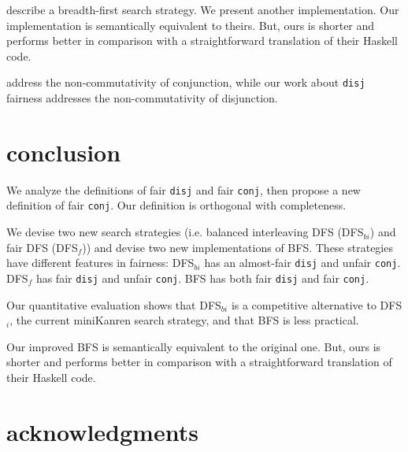\documentclass[format=acmlarge, review=true, authordraft=true]{acmart}
\newcommand{\conj}{\texttt{conj}}
\newcommand{\disj}{\texttt{disj}}
\newcommand{\DFSi }[0]{DFS$_{i}$}
\newcommand{\DFSf }[0]{DFS$_{f}$}
\newcommand{\DFSbi}[0]{DFS$_{bi}$}
\newcommand{\BFS}[0]{BFS}
\newcommand{\BFSser}[0]{BFS}
\begin{document}
\citet{seres1999algebra} describe a breadth-first search 
strategy. We present another implementation. Our implementation is semantically 
equivalent to theirs. But, ours is shorter and performs better in comparison 
with a straightforward translation of their Haskell code.

\citet{rozplokhas2018improving} address the non-commutativity of conjunction, 
while our work about \disj{} fairness addresses the non-commutativity of 
disjunction.


\section{conclusion}

We analyze the definitions of fair \disj{} and fair \conj{}, then propose a 
new definition of fair \conj{}. Our definition is orthogonal with completeness.

We devise two new search strategies (i.e. balanced interleaving DFS 
(\DFSbi{}) and fair DFS (\DFSf{})) and devise two new 
implementations of \BFS. These strategies have different features 
in fairness: \DFSbi{} has an almost-fair \disj{} and unfair \conj{}. 
\DFSf{} has fair \disj{} and unfair \conj{}. \BFS{} has both fair
\disj{} and fair \conj{}.

Our quantitative evaluation shows that \DFSbi{} is a competitive 
alternative to \DFSi{}, the current miniKanren search strategy,
and that \BFS{} is less practical.

Our improved \BFS{} is semantically equivalent to the original 
one. But, ours is shorter and performs better in comparison with a 
straightforward translation of their Haskell code.



\section*{acknowledgments}



\end{document}
